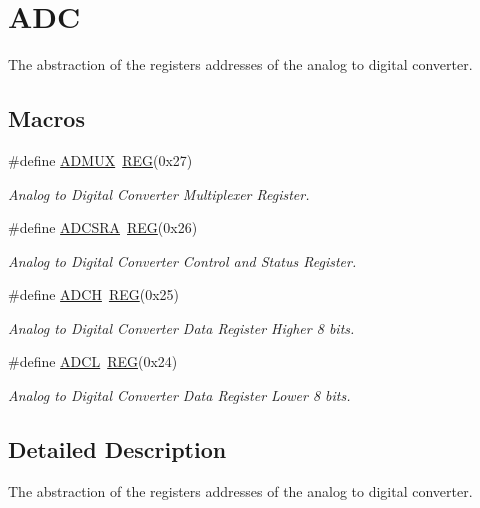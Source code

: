 \hypertarget{group__ADCMCAL}{\section{A\+D\+C}
\label{group__ADCMCAL}
}


The abstraction of the registers addresses of the analog to digital converter.  


\subsection*{Macros}
\begin{DoxyCompactItemize}
\item 
\hypertarget{group__ADCMCAL_ga377bb6c1e346a574c45268a4f585784e}{\#define \hyperlink{group__ADCMCAL_ga377bb6c1e346a574c45268a4f585784e}{A\+D\+M\+U\+X}~\hyperlink{group__MCAL_ga72e45020e46f285689db51c46f273403}{R\+E\+G}(0x27)}\label{group__ADCMCAL_ga377bb6c1e346a574c45268a4f585784e}

\begin{DoxyCompactList}\small\item\em Analog to Digital Converter Multiplexer Register. \end{DoxyCompactList}\item 
\hypertarget{group__ADCMCAL_ga7fd480e36ca7bd8eb95e2db360ba6b37}{\#define \hyperlink{group__ADCMCAL_ga7fd480e36ca7bd8eb95e2db360ba6b37}{A\+D\+C\+S\+R\+A}~\hyperlink{group__MCAL_ga72e45020e46f285689db51c46f273403}{R\+E\+G}(0x26)}\label{group__ADCMCAL_ga7fd480e36ca7bd8eb95e2db360ba6b37}

\begin{DoxyCompactList}\small\item\em Analog to Digital Converter Control and Status Register. \end{DoxyCompactList}\item 
\hypertarget{group__ADCMCAL_ga976cb8b7e984adb6e50df15bc2ed0116}{\#define \hyperlink{group__ADCMCAL_ga976cb8b7e984adb6e50df15bc2ed0116}{A\+D\+C\+H}~\hyperlink{group__MCAL_ga72e45020e46f285689db51c46f273403}{R\+E\+G}(0x25)}\label{group__ADCMCAL_ga976cb8b7e984adb6e50df15bc2ed0116}

\begin{DoxyCompactList}\small\item\em Analog to Digital Converter Data Register Higher 8 bits. \end{DoxyCompactList}\item 
\hypertarget{group__ADCMCAL_ga6d14071fca4ca708424c027708ebc54b}{\#define \hyperlink{group__ADCMCAL_ga6d14071fca4ca708424c027708ebc54b}{A\+D\+C\+L}~\hyperlink{group__MCAL_ga72e45020e46f285689db51c46f273403}{R\+E\+G}(0x24)}\label{group__ADCMCAL_ga6d14071fca4ca708424c027708ebc54b}

\begin{DoxyCompactList}\small\item\em Analog to Digital Converter Data Register Lower 8 bits. \end{DoxyCompactList}\end{DoxyCompactItemize}


\subsection{Detailed Description}
The abstraction of the registers addresses of the analog to digital converter. 


